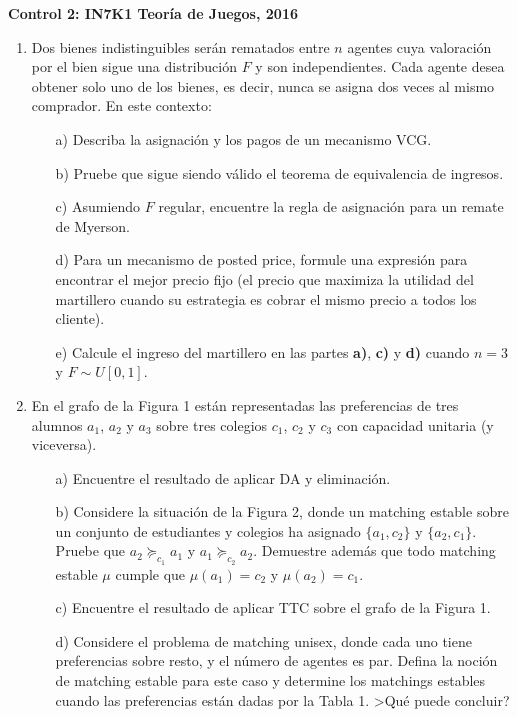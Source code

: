 \documentclass[letterpaper,12pt]{article}
\begin{document}
\begin{center}
	 \bf{Control 2: IN7K1 Teoría de Juegos, 2016}
\end{center}



\begin{enumerate}[\bf P1.]

\item
Dos bienes indistinguibles serán rematados entre $n$ agentes cuya valoración por el bien sigue una distribución $F$ y son independientes. Cada agente desea obtener solo uno de los bienes, es decir, nunca se asigna dos veces al mismo comprador. En este contexto:
 \begin{itemize} 
     \item[a)] Describa la asignación y los pagos de un mecanismo VCG.
     \item[b)] Pruebe que sigue siendo válido el teorema de equivalencia de ingresos.
     \item[c)] Asumiendo $F$ regular, encuentre la regla de asignación para un remate de Myerson.
     \item[d)] Para un mecanismo de posted price, formule una expresión para encontrar el mejor precio fijo (el precio que maximiza la utilidad del martillero cuando su estrategia es cobrar el mismo precio a todos los cliente).
     \item[e)] Calcule el ingreso del martillero en las partes \textbf{a)}, \textbf{c)} y \textbf{d)} cuando $n=3$ y $F\sim U[0,1]$.
\end{itemize}
\item En el grafo de la Figura 1 están representadas las preferencias de tres alumnos $a_1$, $a_2$ y $a_3$ sobre tres colegios $c_1$, $c_2$ y $c_3$ con capacidad unitaria (y viceversa).
\begin{itemize}
    \item[a)] Encuentre el resultado de aplicar DA y eliminación.
    \item[b)] Considere la situación de la Figura 2, donde un matching estable sobre un conjunto de estudiantes y colegios ha asignado $\{a_1,c_2\}$ y $\{a_2,c_1\}$. Pruebe que $a_2\succeq_{c_1} a_1$ y $a_1\succeq_{c_2} a_2$. Demuestre además que todo matching estable $\mu$ cumple que $\mu(a_1)=c_2$ y $\mu(a_2)=c_1$.
    \item[c)] Encuentre el resultado de aplicar TTC sobre el grafo de la Figura 1.
    \item[d)] Considere el problema de matching unisex, donde cada uno tiene preferencias sobre resto, y el número de agentes es par. Defina la noción de matching estable para este caso y determine los matchings estables cuando las preferencias están dadas por la Tabla 1. >Qu\'e puede concluir?


\end{itemize}
\end{enumerate}
\end{document}
